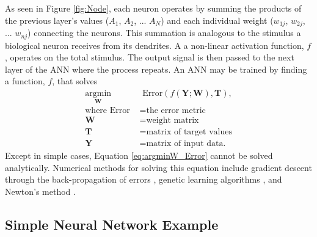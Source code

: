 As seen in Figure \ref{fig:Node}, each neuron operates by summing the products of the previous layer's values ($A{_1}$, $A{_2}$, ... $A{_N}$) and each individual weight ($w_{1j}$, $w_{2j}$, ... $w_{nj}$) connecting the neurons. This summation is analogous to the stimulus a biological neuron receives from its dendrites. A a non-linear activation function, $f$, operates on the total stimulus. The output signal is then passed to the next layer of the ANN where the process repeats. An ANN may be trained by finding a function, $f$, that solves
%
\begin{align} \label{eq:argminW_Error}
\underset{\mathbf{W}}{\text{argmin}} &{\text{ Error}}(f(\mathbf{Y} ; \mathbf{W} ) , \mathbf{T} ), \\
\text{where Error } &= \text{the error metric} \nonumber \\
\mathbf{W} &= \text{weight matrix} \nonumber \\
\mathbf{T} &= \text{matrix of target values} \nonumber \\
\mathbf{Y} &= \text{matrix of input data.} \nonumber
\end{align}
%
Except in simple cases, Equation \ref{eq:argminW_Error} cannot be solved analytically. Numerical methods for solving this equation include gradient descent through the back-propagation of errors \cite{Rumelhart1986}, genetic learning algorithms \cite{Yao1999}, and Newton's method \cite{Fletcher2000}.


\subsection{Simple Neural Network Example}

